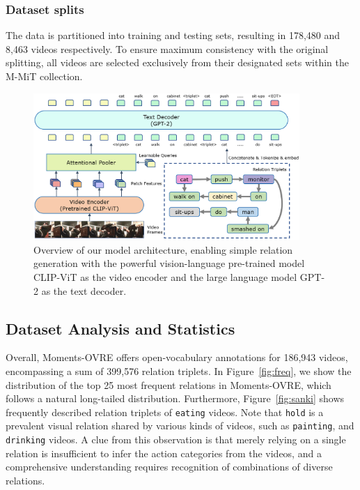 \documentclass[letterpaper]{article}
\begin{document}
\subsubsection{Dataset splits}
The data is partitioned into training and testing sets, resulting in 178,480 and 8,463 videos respectively.
To ensure maximum consistency with the original splitting, all videos are selected exclusively from their designated sets within the M-MiT collection.
\begin{figure}[t]
  \centering
  \includegraphics[width=0.9\textwidth]{fig/model-.png}
  \caption{Overview of our model architecture, enabling simple relation generation with the powerful vision-language pre-trained model CLIP-ViT as the video encoder and the large language model GPT-2 as the text decoder.
  }
  \label{fig:arch}
\end{figure}

\subsection{Dataset Analysis and Statistics}
Overall, Moments-OVRE offers open-vocabulary annotations for 186,943 videos, encompassing a sum of 399,576 relation triplets.
In Figure~\ref{fig:freq}, we show the distribution of the top 25 most frequent relations in Moments-OVRE, which follows a natural long-tailed distribution. Furthermore, Figure~\ref{fig:sanki} shows frequently described relation triplets of \texttt{eating} videos. Note that \texttt{hold} is a prevalent visual relation shared by various kinds of videos, such as \texttt{painting}, and \texttt{drinking} videos. A clue from this observation is that merely relying on a single relation is insufficient to infer the action categories from the videos, and a comprehensive understanding requires recognition of combinations of diverse relations.
\end{document}
